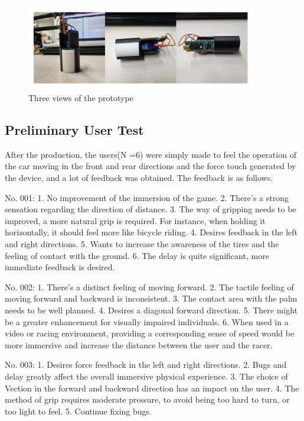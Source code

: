 \begin{figure}[h]
\centering
\includegraphics[width=0.9\textwidth]{A_thesis/figures/030.png}
\caption{Three views of the prototype}
\end{figure}


\subsection{Preliminary User Test}
After the production, the users(N =6) were simply made to feel the operation of the car moving in the front and rear directions and the force touch generated by the device, and a lot of feedback was obtained. The feedback is as follows.

No. 001:    1. No improvement of the immersion of the game.
2. There's a strong sensation regarding the direction of distance.
3. The way of gripping needs to be improved, a more natural grip is required. For instance, when holding it horizontally, it should feel more like bicycle riding.
4. Desires feedback in the left and right directions.
5. Wants to increase the awareness of the tires and the feeling of contact with the ground.
6. The delay is quite significant, more immediate feedback is desired.

No. 002:    1. There's a distinct feeling of moving forward.
2. The tactile feeling of moving forward and backward is inconsistent.
3. The contact area with the palm needs to be well planned.
4. Desires a diagonal forward direction.
5. There might be a greater enhancement for visually impaired individuals.
6. When used in a video or racing environment, providing a corresponding sense of speed would be more immersive and increase the distance between the user and the racer.

No. 003:    1. Desires force feedback in the left and right directions.
2. Bugs and delay greatly affect the overall immersive physical experience.
3. The choice of Vection in the forward and backward direction has an impact on the user.
4. The method of grip requires moderate pressure, to avoid being too hard to turn, or too light to feel.
5. Continue fixing bugs.

